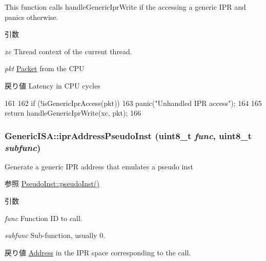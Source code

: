 This function calls handleGenericIprWrite if the accessing a generic IPR and panics otherwise.


\begin{DoxyParams}{引数}
\item[{\em xc}]Thread context of the current thread. \item[{\em pkt}]\hyperlink{classPacket}{Packet} from the CPU \end{DoxyParams}
\begin{DoxyReturn}{戻り値}
Latency in CPU cycles 
\end{DoxyReturn}



\begin{DoxyCode}
161     {
162         if (!isGenericIprAccess(pkt))
163             panic("Unhandled IPR access\n");
164 
165         return handleGenericIprWrite(xc, pkt);
166     }
\end{DoxyCode}
\hypertarget{namespaceGenericISA_a79a8335aadefb64d22e7fc06ac063ad0}{
\subsubsection[{iprAddressPseudoInst}]{ GenericISA::iprAddressPseudoInst (uint8\_\-t {\em func}, \/  uint8\_\-t {\em subfunc})}}
\label{namespaceGenericISA_a79a8335aadefb64d22e7fc06ac063ad0}
Generate a generic IPR address that emulates a pseudo inst

\begin{DoxySeeAlso}{参照}
\hyperlink{namespacePseudoInst_a469ba8e314952a0076e086dee22ea6de}{PseudoInst::pseudoInst()}
\end{DoxySeeAlso}

\begin{DoxyParams}{引数}
\item[{\em func}]Function ID to call. \item[{\em subfunc}]Sub-\/function, usually 0. \end{DoxyParams}
\begin{DoxyReturn}{戻り値}
\hyperlink{classAddress}{Address} in the IPR space corresponding to the call. 
\end{DoxyReturn}



